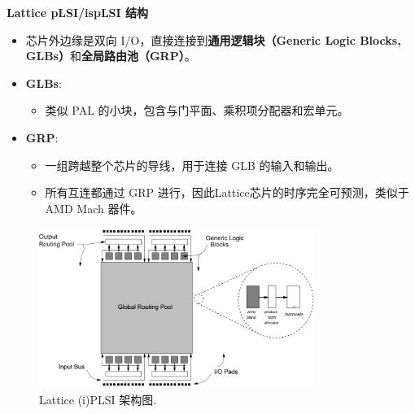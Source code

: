 \begin{frame}[allowframebreaks]{\textbf{Lattice pLSI/ispLSI 结构}}
    \begin{itemize}
    \tightlist
    \item
    芯片外边缘是双向
    I/O，直接连接到\textbf{通用逻辑块（Generic Logic Blocks,
    GLBs）}和\textbf{全局路由池（GRP）}。
    \item
    \textbf{GLBs}:

    \begin{itemize}
    \tightlist
    \item
        类似 PAL 的小块，包含与门平面、乘积项分配器和宏单元。
    \end{itemize}
    \item
    \textbf{GRP}:

    \begin{itemize}
    \tightlist
    \item
        一组跨越整个芯片的导线，用于连接 GLB 的输入和输出。
    \item
        所有互连都通过 GRP 进行，因此Lattice芯片的时序完全可预测，类似于
        AMD Mach 器件。
    \end{itemize}
\end{itemize}
\pagebreak
\begin{figure}
    \centering
    \includegraphics[width=0.8\textwidth]{img1/lattice.jpeg}
    \caption{Lattice (i)PLSI 架构图.}
\end{figure}

\end{frame}


